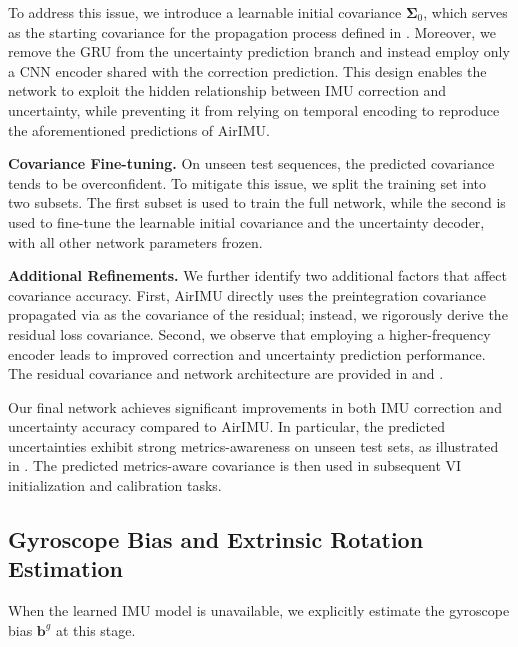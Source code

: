 To address this issue, we introduce a learnable initial covariance $\bm{\Sigma}_0$, which serves as the starting covariance for the propagation process defined in . Moreover, we remove the GRU from the uncertainty prediction branch and instead employ only a CNN encoder shared with the correction prediction. This design enables the network to exploit the hidden relationship between IMU correction and uncertainty, while preventing it from relying on temporal encoding to reproduce the aforementioned predictions of AirIMU.

\noindent \textbf{Covariance Fine-tuning.}
On unseen test sequences, the predicted covariance tends to be overconfident. To mitigate this issue, we split the training set into two subsets. The first subset is used to train the full network, while the second is used to fine-tune the learnable initial covariance and the uncertainty decoder, with all other network parameters frozen.

\noindent \textbf{Additional Refinements.}
We further identify two additional factors that affect covariance accuracy. First, AirIMU directly uses the preintegration covariance propagated via  as the covariance of the residual; instead, we rigorously derive the residual loss covariance. 
Second, we observe that employing a higher-frequency encoder leads to improved correction and uncertainty prediction performance. The residual covariance and network architecture are provided in  and .

Our final network achieves significant improvements in both IMU correction and uncertainty accuracy compared to AirIMU. In particular, the predicted uncertainties exhibit strong metrics-awareness on unseen test sets, as illustrated in . The predicted metrics-aware covariance is then used in subsequent VI initialization and calibration tasks.


\subsection{Gyroscope Bias and Extrinsic Rotation Estimation}
\label{sec:maci2:gyro_bias}

When the learned IMU model is unavailable, we explicitly estimate the gyroscope bias $\mathbf{b}^g$ at this stage. 

